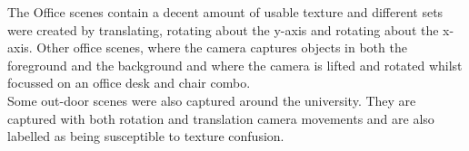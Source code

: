 The Office scenes contain a decent amount of usable texture and different sets were created by translating, rotating about the y-axis and rotating about the x-axis. Other office scenes, where the camera captures objects in both the foreground and the background and where the camera is lifted and rotated whilst focussed on an office desk and chair combo. \\

Some out-door scenes were also captured around the university. They are captured with both rotation and translation camera movements and are also labelled as being susceptible to texture confusion.